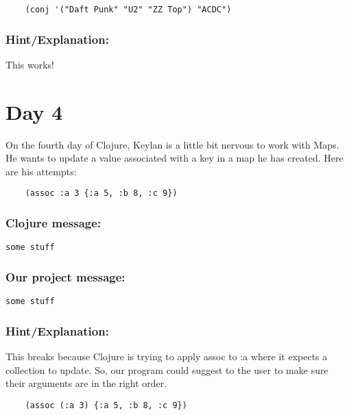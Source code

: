 \documentclass[12pt]{article}
\begin{document}
\begin{verbatim}
	(conj '("Daft Punk" "U2" "ZZ Top") "ACDC")
\end{verbatim}

{\addtolength{\leftskip}{10mm}
	
	\subsubsection*{Hint/Explanation:}
	
This works!
	
}

\section{Day 4}
On the fourth day of Clojure, Keylan is a little bit nervous to work with Maps. He wants to update a value associated with a key in a map he has created. Here are his attempts:

\begin{verbatim}
	(assoc :a 3 {:a 5, :b 8, :c 9})
\end{verbatim}

{\addtolength{\leftskip}{10mm}

	\subsubsection*{Clojure message:}
	
	\verb|some stuff|

	\subsubsection*{Our project message:}
	
	\verb|some stuff|
	
	\subsubsection*{Hint/Explanation:}
	
This breaks because Clojure is trying to apply assoc to :a where it expects a collection to update. So, our program could suggest to the user to make sure their arguments are in the right order.
	
}

\begin{verbatim}
	(assoc (:a 3) {:a 5, :b 8, :c 9})
\end{verbatim}
\end{document}
